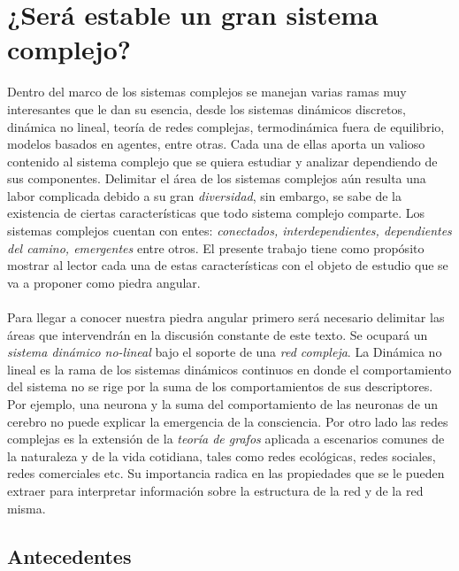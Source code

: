 \chapter{¿Será estable un gran sistema complejo?}

Dentro del marco de los sistemas complejos se manejan varias ramas muy interesantes que le dan su esencia, desde los sistemas dinámicos discretos, dinámica no lineal, teoría de redes complejas, termodinámica fuera de equilibrio, modelos basados en agentes, entre otras. Cada una de ellas aporta un valioso contenido al sistema complejo que se quiera estudiar y analizar dependiendo de sus componentes. Delimitar el área de los sistemas complejos aún resulta una labor complicada debido a su gran \textit{diversidad}, sin embargo, se sabe de la existencia de ciertas características que todo sistema complejo comparte. Los sistemas complejos cuentan con entes: \textit{conectados, interdependientes, dependientes del camino, emergentes} entre otros. El presente trabajo tiene como propósito mostrar al lector cada una de estas características con el objeto de estudio que se va a proponer como piedra angular.\\
\\
Para llegar a conocer nuestra piedra angular primero será necesario delimitar las áreas que intervendrán en la discusión constante de este texto. Se ocupará un \textit{sistema dinámico no-lineal} bajo el soporte de una \textit{red compleja}. La Dinámica no lineal es la rama de los sistemas dinámicos continuos en donde el comportamiento del sistema no se rige por la suma de los comportamientos de sus descriptores. Por ejemplo, una neurona y la suma del comportamiento de las neuronas de un cerebro no puede explicar la emergencia de la consciencia. Por otro lado las redes complejas es la extensión de la \textit{teoría de grafos} aplicada a escenarios comunes de la naturaleza y de la vida cotidiana, tales como redes ecológicas, redes sociales, redes comerciales etc. Su importancia radica en las propiedades que se le pueden extraer para interpretar información sobre la estructura de la red y de la red misma.

\section{Antecedentes}

